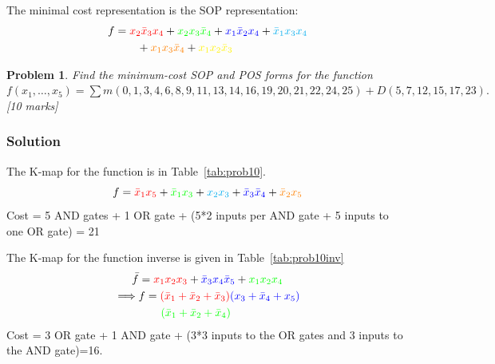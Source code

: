 \documentclass[twocolumn]{article}
\newtheorem{prob}{Problem}
\newcommand{\bx}{\bar{x}}
\newcommand{\cred}{\color{red}}
\newcommand{\cg}{\color{green}}
\newcommand{\cb}{\color{blue}}
\begin{document}
 The minimal cost representation is the SOP representation:
 \begin{align*}
   f &= { \cred x_2 \bx_3 x_4 } +  { \cg x_2 x_3 \bx_4} + {\cb x_1 \bx_2 x_4} +
       {\color{cyan} \bx_1 x_3 x_4 }
   \\
     &\qquad + {\color{orange} x_1 x_3 \bx_4} +
       {\color{yellow} x_1 x_2 \bx_3 }
 \end{align*}


\begin{prob}
  Find the minimum-cost SOP and POS forms for the function $f(x_1 , \dots, x_5) =
  \sum m(0, 1, 3, 4, 6, 8, 9, 11, 13, 14, 16, 19, 20, 21, 22, 24, 25) + D(5, 7,
  12, 15, 17, 23).$  \cite[Prob 2.42]{brown2013fundamentals} [10 marks]
\end{prob}

\subsubsection*{Solution}
The K-map for the function is in Table~\ref{tab:prob10}.
\[
  f = {\cred \bx_1 x_5 } + {\cg \bx_1 x_3 } + {\color{cyan} x_2 x_3 }
  + {\cb \bx_3 \bx_4} + {\color{orange} \bx_2 x_5}
\]
 Cost = 5 AND gates + 1 OR gate + (5*2 inputs per AND gate + 5 inputs to one OR gate) = 21

 The K-map for the function inverse is given in Table~\ref{tab:prob10inv}
 \begin{align*}
   \bar{f} &= {\cred x_1 x_2 x_3} + {\cb \bx_3 x_4 \bx_5 } + {\cg x_1 x_2 x_4}
   \\
   \implies  &f = {\cred (\bx_1 + \bx_2 + \bx_3)}{\cb (x_3 + \bx_4 + x_5)}
               \\&\qquad{\cg (\bx_1 + \bx_2 + \bx_4)}
 \end{align*}
 Cost = 3 OR gate + 1 AND gate + (3*3 inputs to the OR gates and 3 inputs to the AND gate)=16.
 


\end{document}
